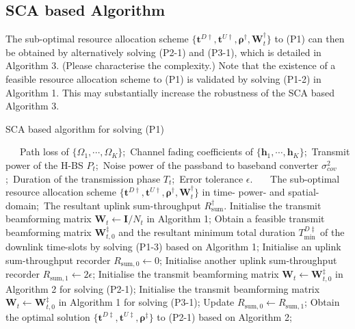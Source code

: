 \documentclass[12pt,draft,onecolumn,journal]{IEEEtran}
\begin{document}
\subsection{SCA based Algorithm}

The sub-optimal resource allocation scheme $\{\mathbf{t}^{D\dagger}, \mathbf{t}^{U\dagger}, \boldsymbol{\rho}^{\dagger}, \mathbf{W}_t^{\dagger}\}$ to (P1) can then be obtained by alternatively solving (P2-1) and (P3-1), which is detailed in Algorithm 3. {\color{red} (Please characterise the complexity.)}  Note that the existence of a feasible resource allocation scheme to (P1) is validated by solving (P1-2) in Algorithm 1. This may substantially increase the robustness of the SCA based Algorithm 3.

\begin{algorithm}[!t]
	\caption{SCA based algorithm for solving (P1)}
	\footnotesize
	\begin{algorithmic}[1]
		\REQUIRE ~~\
		Path loss of $\{\Omega_1,\cdots,\Omega_K\}$;\
		Channel fading coefficients of $\{\mathbf{h}_1,\cdots,\mathbf{h}_K\}$;\
		Transmit power of the H-BS $P_{t}$;\
		Noise power of the passband to baseband converter $\sigma^2_{cov}$;\
		Duration of the transmission phase $T_t$;\
		Error tolerance $\epsilon$.
		\ENSURE ~~\
		The sub-optimal resource allocation scheme $\{\mathbf{t}^{D\dagger}, \mathbf{t}^{U\dagger}, \boldsymbol{\rho}^{\dagger}, \mathbf{W}_t^{\dagger}\}$ in time- power- and spatial-domain;\
		The resultant uplink sum-throughput $R_{\text{sum}}^{\dagger}$.
		\STATE Initialise the transmit beamforming matrix $\mathbf{W}_t\leftarrow \mathbf{I} / N_t$ in Algorithm 1;
		\STATE Obtain a feasible transmit beamforming matrix $\mathbf{W}_{t,0}^{\ddagger}$ and the resultant minimum total duration $T_{\min}^{D\ddagger}$ of the downlink time-slots by solving (P1-3) based on Algorithm 1;
		\IF{$T_{\min}^{D\ddagger} < T_t$}
			\STATE Initialise an uplink sum-throughput recorder $R_{\text{sum},0}\leftarrow 0$;
			\STATE Initialise another uplink sum-throughput recorder $R_{\text{sum},1}\leftarrow 2\epsilon$;
			\STATE Initialise the transmit beamforming matrix $\mathbf{W}_t\leftarrow \mathbf{W}_{t,0}^{\ddagger}$ in Algorithm 2 for solving (P2-1);
			\STATE Initialise the transmit beamforming matrix $\mathbf{W}_t\leftarrow \mathbf{W}_{t,0}^{\ddagger}$ in Algorithm 1 for solving (P3-1);
				\STATE Update $R_{\text{sum},0}\leftarrow R_{\text{sum},1}$;
				\STATE Obtain the optimal solution $\{\mathbf{t}^{D\ddagger}, \mathbf{t}^{U\ddagger}, \boldsymbol{\rho}^{\ddagger}\}$ to (P2-1) based on Algorithm 2;

\end{algorithmic}
\end{algorithm}
\end{document}
